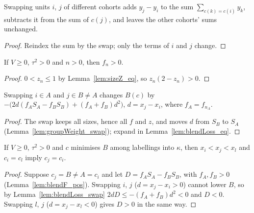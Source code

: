 \begin{lemma}\label{lem:groupWeight_swap}
  \leanok
  Swapping units $i$, $j$ of different cohorts adds $y_j - y_i$ to the sum
  $\sum_{c(k)=c(i)} y_k$, subtracts it from the sum of $c(j)$, and leaves
  the other cohorts' sums unchanged.
\end{lemma}
\begin{proof}
  \leanok
  Reindex the sum by the swap; only the terms of $i$ and $j$ change.
\end{proof}

\begin{lemma}\label{lem:blendF_pos}
  \leanok
  If $V \ge 0$, $\tau^2 > 0$ and $n > 0$, then $f_n > 0$.
\end{lemma}
\begin{proof}
  \leanok
  $0 < z_n \le 1$ by Lemma~\ref{lem:sizeZ_eq}, so $z_n(2 - z_n) > 0$.
\end{proof}

\begin{lemma}\label{lem:blendLoss_swap}
  \leanok
  Swapping $i \in A$ and $j \in B \ne A$ changes $B(c)$ by
  $-\bigl(2d(f_A S_A - f_B S_B) + (f_A + f_B)d^2\bigr)$, $d = x_j - x_i$,
  where $f_A = f_{n_A}$.
\end{lemma}
\begin{proof}
  \leanok
  The swap keeps all sizes, hence all $f$ and $z$, and moves $d$ from $S_B$
  to $S_A$ (Lemma~\ref{lem:groupWeight_swap}); expand in
  Lemma~\ref{lem:blendLoss_eq}.
\end{proof}

\begin{theorem}\label{thm:blend_optimal_contiguous}
  \leanok
  If $V \ge 0$, $\tau^2 > 0$ and $c$ minimises $B$ among labellings into
  $\kappa$, then $x_i < x_j < x_l$ and $c_i = c_l$ imply $c_j = c_i$.
\end{theorem}
\begin{proof}
  \leanok
  Suppose $c_j = B \ne A = c_i$ and let $D = f_A S_A - f_B S_B$, with
  $f_A, f_B > 0$ (Lemma~\ref{lem:blendF_pos}). Swapping $i$, $j$
  ($d = x_j - x_i > 0$) cannot lower $B$, so by Lemma~\ref{lem:blendLoss_swap}
  $2dD \le -(f_A + f_B)d^2 < 0$ and $D < 0$. Swapping $l$, $j$
  ($d = x_j - x_l < 0$) gives $D > 0$ in the same way.
\end{proof}

